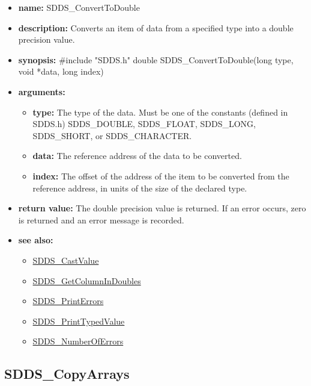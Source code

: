 \documentclass[11pt]{article}
\newcommand{\progref}[1]{\hyperref{SDDS_#1}{{\tt SDDS\_#1} (}{)}{SDDS_#1}}
\begin{document}
\begin{itemize}
\item {\bf name:}\newline
SDDS\_ConvertToDouble
\item {\bf description:}\newline
Converts an item of data from a specified type into a double precision value.
\item {\bf synopsis:} \#include "SDDS.h"\newline
double SDDS\_ConvertToDouble(long type, void *data, long index)
\item {\bf arguments:}
\begin{itemize}
\item {\bf type:} The type of the data. Must be one of the constants (defined in SDDS.h) SDDS\_DOUBLE, SDDS\_FLOAT, SDDS\_LONG, SDDS\_SHORT, or SDDS\_CHARACTER.
\item {\bf data:} The reference address of the data to be converted.
\item {\bf index:} The offset of the address of the item to be converted from the reference address, in units of the size of the declared type.
\end{itemize}
\item {\bf return value:}\newline
 The double precision value is returned. If an error occurs, zero is returned and an error message is recorded.
\item {\bf see also:}
\begin{itemize}
\item \progref{CastValue}
\item \progref{GetColumnInDoubles}
\item \progref{PrintErrors}
\item \progref{PrintTypedValue}
\item \progref{NumberOfErrors}
\end{itemize}
\end{itemize}

\subsection{SDDS\_CopyArrays}
\label{SDDS_CopyArrays}
\end{document}
